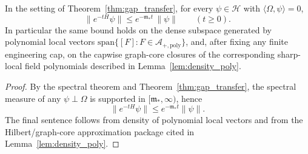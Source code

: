 \begin{theorem}\label{thm:gap_loc}
In the setting of Theorem~\ref{thm:gap_transfer}, for every $\psi\in\mathcal H$ with $\langle\Omega,\psi\rangle=0$,
\[
\|e^{-tH}\psi\|\le e^{-\mathfrak m_\ast t}\,\|\psi\|\qquad (t\ge 0).
\]
In particular the same bound holds on the dense subspace generated by polynomial local vectors
$\mathrm{span}\{[F]:F\in\mathcal A_{+,\mathrm{poly}}\}$,
and, after fixing any finite engineering cap, on the capwise graph-core closures of the corresponding sharp-local field polynomials described in Lemma~\ref{lem:density_poly}.
\end{theorem}

\begin{proof}
By the spectral theorem and Theorem~\ref{thm:gap_transfer},
the spectral measure of any $\psi\perp\Omega$ is supported in $[\mathfrak m_\ast,\infty)$, hence
\[
\|e^{-tH}\psi\|\le e^{-\mathfrak m_\ast t}\|\psi\|.
\]
The final sentence follows from density of polynomial local vectors and from the Hilbert/graph-core approximation package cited in Lemma~\ref{lem:density_poly}.
\end{proof}
